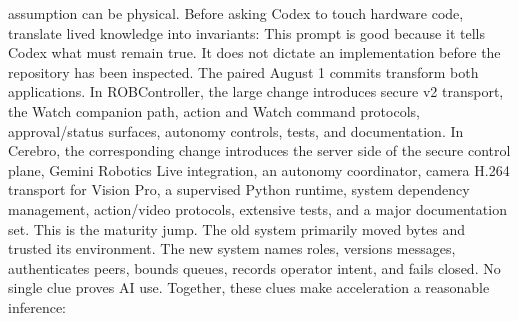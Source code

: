 {}assumption can be physical.\markdownRendererInterblockSeparator
{}\markdownRendererSectionBegin
{}\markdownRendererInterblockSeparator
{}Before asking Codex to touch hardware code, translate lived knowledge into\markdownRendererSoftLineBreak
{}invariants:\markdownRendererInterblockSeparator
{}\markdownRendererInterblockSeparator
{}This prompt is good because it tells Codex what must remain true. It does not\markdownRendererSoftLineBreak
{}dictate an implementation before the repository has been inspected.\markdownRendererInterblockSeparator
{}\markdownRendererThematicBreak{}\markdownRendererInterblockSeparator
{}
\markdownRendererSectionEnd 
\markdownRendererSectionEnd \markdownRendererSectionBegin
{}\markdownRendererInterblockSeparator
{}The paired August 1 commits transform both applications.\markdownRendererParagraphSeparator
{}In ROBController, the large change introduces secure v2 transport, the Watch\markdownRendererSoftLineBreak
{}companion path, action and Watch command protocols, approval/status surfaces,\markdownRendererSoftLineBreak
{}autonomy controls, tests, and documentation.\markdownRendererParagraphSeparator
{}In Cerebro, the corresponding change introduces the server side of the secure\markdownRendererSoftLineBreak
{}control plane, Gemini Robotics Live integration, an autonomy coordinator,\markdownRendererSoftLineBreak
{}camera H.264 transport for Vision Pro, a supervised Python runtime, system\markdownRendererSoftLineBreak
{}dependency management, action/video protocols, extensive tests, and a major\markdownRendererSoftLineBreak
{}documentation set.\markdownRendererParagraphSeparator
{}This is the maturity jump. The old system primarily moved bytes and trusted its\markdownRendererSoftLineBreak
{}environment. The new system names roles, versions messages, authenticates\markdownRendererSoftLineBreak
{}peers, bounds queues, records operator intent, and fails closed.\markdownRendererInterblockSeparator
{}\markdownRendererSectionBegin
{}\markdownRendererInterblockSeparator
{}No single clue proves AI use. Together, these clues make acceleration a\markdownRendererSoftLineBreak
{}reasonable inference:\markdownRendererInterblockSeparator
{}\markdownRendererOlBegin
